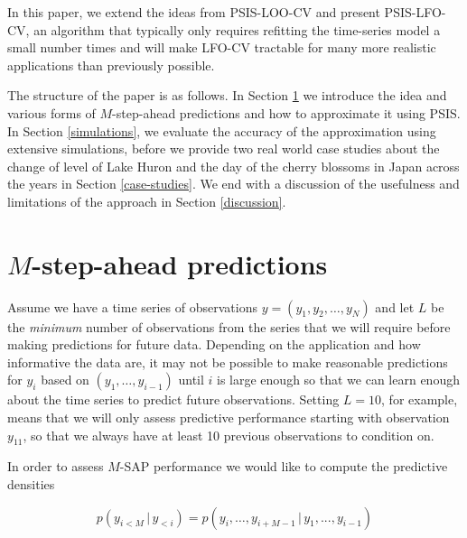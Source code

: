 \documentclass[american,]{article}
\begin{document}
In this paper, we extend the ideas from PSIS-LOO-CV and 
present PSIS-LFO-CV, an algorithm that typically only requires refitting the
time-series model a small number times and will make LFO-CV tractable for many
more realistic applications than previously possible.

The structure of the paper is as follows. In Section \ref{m-sap} we introduce
the idea and various forms of \(M\)-step-ahead predictions and how to approximate
it using PSIS. In Section \ref{simulations}, we evaluate the accuracy of the
approximation using extensive simulations, before we provide two real world case
studies about the change of level of Lake Huron and the day of the cherry
blossoms in Japan across the years in Section \ref{case-studies}. We end with a
discussion of the usefulness and limitations of the approach in Section
\ref{discussion}.

\hypertarget{m-sap}{%
\section{\texorpdfstring{\(M\)-step-ahead predictions}{M-step-ahead predictions}}\label{m-sap}}

Assume we have a time series of observations \(y = (y_1, y_2, \ldots, y_N)\)
and let \(L\) be the \emph{minimum} number of observations from the series that
we will require before making predictions for future data. Depending on the
application and how informative the data are, it may not be possible to make
reasonable predictions for \(y_{i}\) based on \((y_1, \dots, y_{i-1})\) until \(i\) is
large enough so that we can learn enough about the time series to predict future
observations. Setting \(L=10\), for example, means that we will only assess
predictive performance starting with observation \(y_{11}\), so that we
always have at least 10 previous observations to condition on.

In order to assess \(M\)-SAP performance we would like to compute the
predictive densities

\begin{equation}
p(y_{i<M} \,|\, y_{<i}) = p(y_i, \ldots, y_{i + M - 1} \,|\, y_{1},...,y_{i-1}) 
\end{equation}
\end{document}
